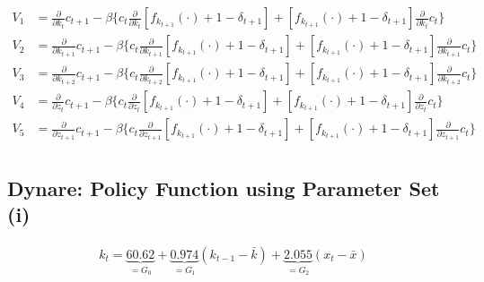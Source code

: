 \documentclass[a4paper]{article}
\theoremstyle{definition}
\begin{document}
	\begin{align*}
	V_1 	&= \frac{\partial}{\partial k_t}c_{t+1} - \beta \Big\{ c_t \frac{\partial}{\partial k_t}[f_{k_{t+1}}(\cdot)+1-\delta_{t+1}] + [f_{k_{t+1}}(\cdot)+1-\delta_{t+1}]\frac{\partial}{\partial k_t}c_t \Big\} \\
	V_2 	&= \frac{\partial}{\partial k_{t+1}}c_{t+1} - \beta \Big\{ c_t \frac{\partial}{\partial k_{t+1}}[f_{k_{t+1}}(\cdot)+1-\delta_{t+1}] + [f_{k_{t+1}}(\cdot)+1-\delta_{t+1}]\frac{\partial}{\partial k_{t+1}}c_t \Big\} \\
	V_3 	&= \frac{\partial}{\partial k_{t+2}}c_{t+1} - \beta \Big\{ c_t \frac{\partial}{\partial k_{t+2}}[f_{k_{t+1}}(\cdot)+1-\delta_{t+1}] + [f_{k_{t+1}}(\cdot)+1-\delta_{t+1}]\frac{\partial}{\partial k_{t+2}}c_t \Big\} \\	
	V_4 	&= \frac{\partial}{\partial z_{t}}c_{t+1} - \beta \Big\{ c_t \frac{\partial}{\partial z_{t}}[f_{k_{t+1}}(\cdot)+1-\delta_{t+1}] + [f_{k_{t+1}}(\cdot)+1-\delta_{t+1}]\frac{\partial}{\partial z_{t}}c_t \Big\} \\		
	V_5 	&= \frac{\partial}{\partial z_{t+1}}c_{t+1} - \beta \Big\{ c_t \frac{\partial}{\partial z_{t+1}}[f_{k_{t+1}}(\cdot)+1-\delta_{t+1}] + [f_{k_{t+1}}(\cdot)+1-\delta_{t+1}]\frac{\partial}{\partial z_{t+1}}c_t \Big\} \\		
	\end{align*}	
%
%
%
%
%
%
%
%
%
%
%
%
%
%
%
%
\newpage
\subsection{Dynare: Policy Function using Parameter Set (i)}
	\begin{align*}
	k_t = \underbrace{60.62}_{=G_0} + \underbrace{0.974}_{=G_1} (k_{t-1}-\bar k) + \underbrace{2.055}_{=G_2} (x_t-\bar x)
	\end{align*}

\newpage
\end{document}
